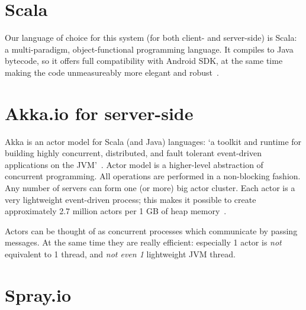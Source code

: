 %
%
%
%
%

\section{Scala}
\label{sec:scala}

Our language of choice for this system (for both client- and server-side) is Scala: a multi-paradigm, object-functional programming language. It compiles to Java bytecode, so it offers full compatibility with Android SDK, at the same time making the code unmeasureably more elegant and robust~\cite{Odersky:2008:Programming}.

\section{Akka.io for server-side}
\label{sec:akka}

Akka is an actor model for Scala (and Java) languages: `a toolkit and runtime for building highly concurrent, distributed, and fault tolerant event-driven applications on the JVM'~\cite{Akka:2013:Docs}. Actor model is a higher-level abstraction of concurrent programming. All operations are performed in a non-blocking fashion. Any number of servers can form one (or more) big actor cluster. Each actor is a very lightweight event-driven process; this makes it possible to create approximately 2.7 million actors per 1 GB of heap memory~\cite{Akka:2013:Docs}.

Actors can be thought of as concurrent processes which communicate by passing messages. At the same time they are really efficient: especially 1 actor is \emph{not} equivalent to 1 thread, and \emph{not even 1} lightweight JVM thread.

\section{Spray.io}
\label{sec:xmind}

